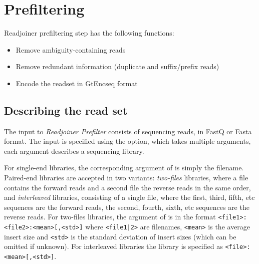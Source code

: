 \documentclass[12pt,titlepage]{article}
\newcommand{\Rdjprefilter}{\textit{Readjoiner Prefilter}\xspace}
\begin{document}

\section{Prefiltering}

Readjoiner prefiltering step has the following functions:
\begin{itemize}
\item Remove ambiguity-containing reads
\item Remove redundant information (duplicate and suffix/prefix reads)
\item Encode the readset in GtEncseq format
\end{itemize}

\subsection{Describing the read set}

The input to \Rdjprefilter consists of sequencing reads, in
FastQ or Fasta format.
The input is specified using the  option, which
takes multiple arguments, each argument describes a sequencing
library.

For single-end libraries, the
corresponding argument of  is simply the filename.
Paired-end libraries are accepted in two variants: \textit{two-files} libraries,
where a file contains the forward reads and a second file the reverse reads
in the same order, and \textit{interleaved} libraries, consisting of a single
file, where the first, third, fifth, etc sequences are the forward reads, the
second, fourth, sixth, etc sequences are the reverse reads.
For two-files libraries, the argument of  is in the format
\verb|<file1>:<file2>:<mean>[,<std>]| where \verb/<file1|2>/ are
 filenames, \verb|<mean>| is the average
insert size and \verb|<std>| is the standard deviation of insert
sizes (which can be omitted if unknown). For interleaved libraries
the library is specified as \verb|<file>:<mean>[,<std>]|.
\end{document}
